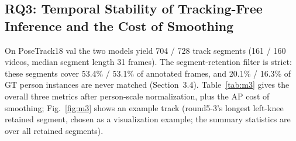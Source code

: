 \documentclass[10pt,conference]{IEEEtran}
\begin{document}
\subsection{RQ3: Temporal Stability of Tracking-Free Inference and the Cost of Smoothing}

On PoseTrack18 val the two models yield 704 / 728 track segments (161 / 160 videos, median segment length 31 frames). The segment-retention filter is strict: these segments cover 53.4\% / 53.1\% of annotated frames, and 20.1\% / 16.3\% of GT person instances are never matched (Section~3.4). Table~\ref{tab:m3} gives the overall three metrics after person-scale normalization, plus the AP cost of smoothing; Fig.~\ref{fig:m3} shows an example track (round5-3's longest left-knee retained segment, chosen as a visualization example; the summary statistics are over all retained segments).

\begin{table}[t]
\centering
\caption{M3 temporal metrics (overall, averaged over 17 keypoints) and smoothing AP cost. Matched-scope AP is the AP recomputed over the same matched track frames used for the jitter metrics (raw values: round5-3 0.1316 / YOLO11s-pose 0.1408); --- $=$ raw reference, no smoothing applied. Bold AP cost $=$ within $\pm0.0002$ of zero (zero accuracy cost). Per-metric domain-difference and between-model CIs are in Appendix~A (Table~A5).}
\label{tab:m3}
\renewcommand{\arraystretch}{1.15}
\end{table}
\end{document}
